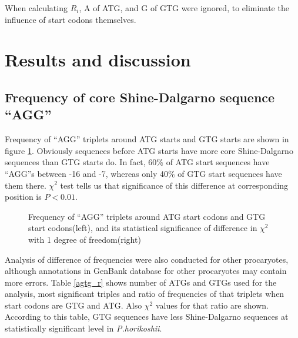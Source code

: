 When calculating \(R_{i}\), A of ATG, and G of GTG were ignored, to
eliminate the influence of start codons themselves.

\section{Results and discussion}

\subsection{Frequency of core Shine-Dalgarno sequence ``AGG''}

Frequency of ``AGG'' triplets around ATG starts and GTG starts are
shown in figure \ref{ecagg}. Obviously sequences before ATG starts
have more core Shine-Dalgarno sequences than GTG starts do. In fact,
60\% of ATG start sequences have ``AGG''s between -16 and -7, whereas
only 40\% of GTG start sequences have them there. \(\chi^{2}\) test
tells us that significance of this difference at corresponding
position is \(P < 0.01\).

\begin{figure}
\begin{center}
\end{center}
\caption{Frequency of ``AGG'' triplets around ATG start codons and GTG 
start codons(left), and its statistical significance of difference in
\(\chi^{2}\) with 1 degree of freedom(right)}
\label{ecagg}
\end{figure}

Analysis of difference of frequencies were also conducted for other
procaryotes, although annotations in GenBank database for other
procaryotes may contain more errors. Table \ref{agtg_r} shows number
of ATGs and GTGs used for the analysis, most significant triples and
ratio of frequencies of that triplets when start codons are GTG and
ATG. Also \(\chi^{2}\) values for that ratio are shown. According to
this table, GTG sequences have less Shine-Dalgarno sequences at
statistically significant level in {\it P.horikoshii}.

